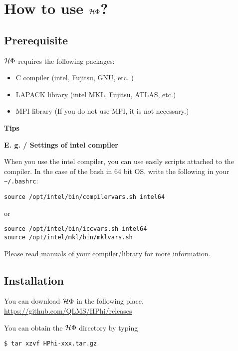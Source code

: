 \chapter{How to use $\mathcal{H} \Phi$?}
\label{Ch:HowTo}

\section{Prerequisite}

$\mathcal{H} \Phi$ requires the following packages:
\begin{itemize}
\item C compiler (intel, Fujitsu, GNU, etc. )
\item LAPACK library (intel MKL, Fujitsu, ATLAS, etc.)
\item MPI library (If you do not use MPI, it is not necessary.)
\end{itemize}

\begin{screen}
\Large 
{\bf Tips}
\normalsize

{\bf E. g. / Settings of intel compiler}

When you use the intel compiler, you can use easily scripts attached to the compiler.
In the case of the bash in 64 bit OS, write the following in your \verb|~/.bashrc|:
\begin{verbatim}
source /opt/intel/bin/compilervars.sh intel64
\end{verbatim}
or
\begin{verbatim}
source /opt/intel/bin/iccvars.sh intel64
source /opt/intel/mkl/bin/mklvars.sh
\end{verbatim}

Please read manuals of your compiler/library for more information.

\end{screen}

\section{Installation}

You can download $\mathcal{H} \Phi$ in the following place.\\
\url{https://github.com/QLMS/HPhi/releases}

You can obtain the $\mathcal{H} \Phi$ directory by typing
\begin{verbatim}
$ tar xzvf HPhi-xxx.tar.gz
\end{verbatim}


